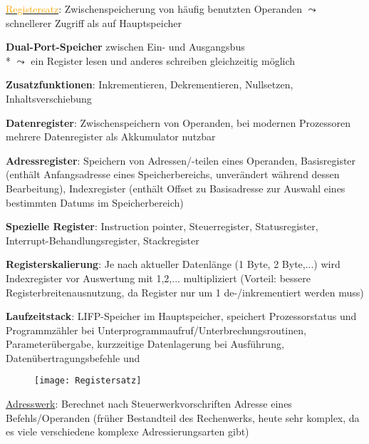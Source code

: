 \begin{items}
	\item \underline{\textcolor{orange}{Registersatz}}: Zwischenspeicherung von häufig benutzten Operanden $\leadsto$ schnellerer Zugriff als auf Hauptspeicher
	\begin{enumeration}
		\item \textbf{Dual-Port-Speicher} zwischen Ein- und Ausgangsbus \\* $\leadsto$ ein Register lesen und anderes schreiben gleichzeitig möglich
		\item \textbf{Zusatzfunktionen}: Inkrementieren, Dekrementieren, Nullsetzen, Inhaltsverschiebung
		\item \textbf{Datenregister}: Zwischenspeichern von Operanden, bei modernen Prozessoren mehrere Datenregister als Akkumulator nutzbar
		\item \textbf{Adressregister}: Speichern von Adressen/-teilen eines Operanden, Basisregister (enthält Anfangsadresse eines Speicherbereichs, unverändert während dessen Bearbeitung), Indexregister (enthält Offset zu Basisadresse zur Auswahl eines bestimmten Datums im Speicherbereich)
		\item \textbf{Spezielle Register}: Instruction pointer, Steuerregister, Statusregister, Interrupt-Behandlungsregister, Stackregister
		\item \textbf{Registerskalierung}: Je nach aktueller Datenlänge (1 Byte, 2 Byte,...) wird Indexregister vor Auswertung mit 1,2,... multipliziert (Vorteil: bessere Registerbreitenausnutzung, da Register nur um 1 de-/inkrementiert werden muss)
		\item \textbf{Laufzeitstack}: LIFP-Speicher im Hauptspeicher, speichert Prozessorstatus und Programmzähler bei Unterprogrammaufruf/Unterbrechungsroutinen, Parameterübergabe, kurzzeitige Datenlagerung bei Ausführung, Datenübertragungsbefehle  und 
	\end{enumeration}
	\begin{figure}[H]
	  \centering
	  \texttt{[image: Registersatz]}
	  \label{Registersatz}
	\end{figure}

	\item \underline{\textcolor{ProcessBlue}{Adresswerk}}: Berechnet nach Steuerwerkvorschriften Adresse eines Befehls/Operanden (früher Bestandteil des Rechenwerks, heute sehr komplex, da es viele verschiedene komplexe Adressierungsarten gibt)


\end{items}
